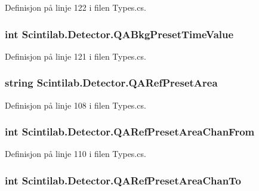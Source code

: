Definisjon på linje 122 i filen Types.\+cs.

\hypertarget{class_scintilab_1_1_detector_a0ee122a2ce4420ce23973b03adae4834}{
\subsubsection[{Q\+A\+Bkg\+Preset\+Time\+Value}]{\setlength{\rightskip}{0pt plus 5cm}int Scintilab.\+Detector.\+Q\+A\+Bkg\+Preset\+Time\+Value}}\label{class_scintilab_1_1_detector_a0ee122a2ce4420ce23973b03adae4834}


Definisjon på linje 121 i filen Types.\+cs.

\hypertarget{class_scintilab_1_1_detector_afb02ab8b47ade4b8d4eb807e7097a503}{
\subsubsection[{Q\+A\+Ref\+Preset\+Area}]{\setlength{\rightskip}{0pt plus 5cm}string Scintilab.\+Detector.\+Q\+A\+Ref\+Preset\+Area}}\label{class_scintilab_1_1_detector_afb02ab8b47ade4b8d4eb807e7097a503}


Definisjon på linje 108 i filen Types.\+cs.

\hypertarget{class_scintilab_1_1_detector_ab2e5f6f0e3e6e575e9165235f83b4ee6}{
\subsubsection[{Q\+A\+Ref\+Preset\+Area\+Chan\+From}]{\setlength{\rightskip}{0pt plus 5cm}int Scintilab.\+Detector.\+Q\+A\+Ref\+Preset\+Area\+Chan\+From}}\label{class_scintilab_1_1_detector_ab2e5f6f0e3e6e575e9165235f83b4ee6}


Definisjon på linje 110 i filen Types.\+cs.

\hypertarget{class_scintilab_1_1_detector_ac6eb4aa3048ab3c3647b4c7e9780e6e8}{
\subsubsection[{Q\+A\+Ref\+Preset\+Area\+Chan\+To}]{\setlength{\rightskip}{0pt plus 5cm}int Scintilab.\+Detector.\+Q\+A\+Ref\+Preset\+Area\+Chan\+To}}\label{class_scintilab_1_1_detector_ac6eb4aa3048ab3c3647b4c7e9780e6e8}


